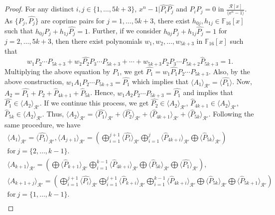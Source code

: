\documentclass{amsart}
\theoremstyle{definition}
\theoremstyle{remark}
\numberwithin{equation}{section}
\begin{document}
\begin{proof}
    For any distinct $i,j\in \{1,\dots,5k+3\}$, $x^n-1| \hat{P_i}\hat{P_j}$ and $P_iP_j=0$ in $\frac{\mathcal{R}[x]}{\langle x^n-1 \rangle}$. As $\{P_j,\hat{P_j}\}$ are coprime pairs for $j=1,\dots,5k+3$, there exist $h_{0j},h_{1j}\in \mathbb F_{16}[x]$ such that $h_{0j}P_j+h_{1j}\hat{P_j}=1$.
		Further, if we consider $h_{0j}P_j+h_{1j}\hat{P_j}=1$ for $j=2,\dots,5k+3$, then there exist polynomials $w_1,w_2,\dots,w_{5k+3}$ in $\mathbb F_{16}[x]$ such that
		$$w_1P_2\cdots P_{5k+3}+w_2\hat{P_2}P_3\cdots P_{5k+3}+\cdots+ w_{5k+3}P_2P_3\cdots P_{5k+2} \hat{P}_{5k+3}=1.$$
	Multiplying the above equation by $\hat{P_1}$, we get
		$\hat{P_1}=w_1 \hat{P_1}P_2\cdots P_{5k+3}.$ Also, by the above construction,
        $w_1A_1P_2\cdots P_{5k+3} = \hat{P_1}$ which implies that $\langle A_1 \rangle_{\mathcal{R}'} = \langle \hat{P_{1}} \rangle $.
        Now, $A_2 = \hat{P_1} + \hat{P_2} + \hat{P}_{4k+1} + \hat{P}_{5k}$. Hence, $w_1A_2P_2\cdots P_{5k+3} = \hat{P_1}$ and implies that $\hat{P_1} \in \langle A_2 \rangle_{\mathcal{R}'}$. If we continue this process, we get $\hat{P_2} \in \langle A_2 \rangle_{\mathcal{R}'}$, $\hat{P}_{4k+1} \in \langle A_2 \rangle_{\mathcal{R}'}$, $\hat{P}_{5k} \in \langle A_2 \rangle_{\mathcal{R}'}$. Thus,
        $ \langle A_2 \rangle_{\mathcal{R}'} = \langle \hat{P_1}\rangle_{\mathcal{R}'} + \langle\hat{P_2}\rangle_{\mathcal{R}'} + \langle \hat{P}_{4k+1} \rangle_{\mathcal{R}'} + \langle \hat{P}_{5k}\rangle_{\mathcal{R}'}$.
        Following the same procedure, we have
        \allowdisplaybreaks
         \begin{gather*}
        \langle A_1 \rangle_{\mathcal{R}'} = \langle \hat{P_{1}} \rangle_{\mathcal{R}'},\langle  A_{j+1} \rangle_{\mathcal{R}'} = \left( \bigoplus_{i=1}^{j+1} \langle \hat{P_i} \rangle_{\mathcal{R}'} \bigoplus_{i=1}^{j} \langle \hat{P}_{4k+i} \rangle_{\mathcal{R}'} \bigoplus \langle \hat{P}_{5k} \rangle_{\mathcal{R}'}  \right) \\ \text{for} ~ j = \{2,\dots,k-1\}. \\
         \langle  A_{k+1} \rangle_{\mathcal{R}'} = \left( \bigoplus \langle \hat{P}_{k+1} \rangle_{\mathcal{R}'} \bigoplus_{i=1}^{k-1} \langle \hat{P}_{4k+i} \rangle_{\mathcal{R}'} \bigoplus \langle \hat{P}_{5k} \rangle_{\mathcal{R}'} \bigoplus \langle \hat{P_{1}} \rangle_{\mathcal{R}'}  \right), \\
        \langle  A_{k+1+j} \rangle_{\mathcal{R}'} = \left( \bigoplus_{i=1}^{j+1} \langle \hat{P_{i}} \rangle_{\mathcal{R}'} \bigoplus_{i=1}^{j+1} \langle \hat{P}_{k+i} \rangle_{\mathcal{R}'} \bigoplus_{i=1}^{k-1} \langle \hat{P}_{4k+i} \rangle_{\mathcal{R}'} \bigoplus \langle \hat{P}_{5k} \rangle_{\mathcal{R}'} \bigoplus \langle \hat{P}_{5k+1} \rangle_{\mathcal{R}'}  \right) \\ \text{for} ~ j = \{1,\dots,k-1\}.  \\

\end{gather*}
\end{proof}
\end{document}
